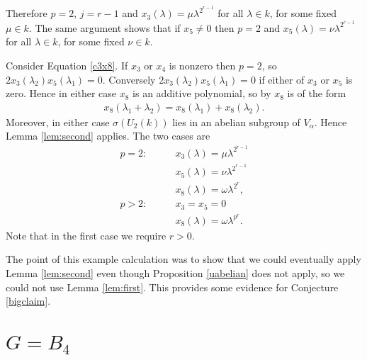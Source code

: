 Therefore $p = 2$, $j=r-1$ and $x_3(\lambda) = \mu \lambda^{2^{r-1}}$ for all $\lambda\in k$, for some fixed $\mu\in k$. The same argument shows that if $x_5 \neq 0$ then $p=2$ and $x_5(\lambda) = \nu \lambda^{2^{r-1}}$ for all $\lambda \in k$, for some fixed $\nu\in k$.

Consider Equation \ref{c3x8}. If $x_3$ or $x_4$ is nonzero then $p=2$, so $2x_3(\lambda_2)x_5(\lambda_1) = 0$. Conversely $2x_3(\lambda_2)x_5(\lambda_1) = 0$ if either of $x_3$ or $x_5$ is zero. Hence in either case $x_8$ is an additive polynomial, so by \cite[\S 20.3, Lemma A]{humphreys1975linear} $x_8$ is of the form
\begin{align*}
	x_8(\lambda_1 + \lambda_2) = x_8(\lambda_1) + x_8(\lambda_2).
\end{align*}
Moreover, in either case $\sigma\left(U_2(k)\right)$ lies in an abelian subgroup of $V_\alpha$. Hence Lemma \ref{lem:second} applies. The two cases are
\begin{align*}
p=2: \qquad&x_3(\lambda) = \mu \lambda^{2^{r-1}} \\
	&x_5(\lambda) = \nu \lambda^{2^{r-1}} \\
	&x_8(\lambda) = \omega \lambda^{2^r}, \\
p>2: \qquad&x_3=x_5=0 \\
	&x_8(\lambda) = \omega \lambda^{p^r}.
\end{align*}
Note that in the first case we require $r>0$.

The point of this example calculation was to show that we could eventually apply Lemma \ref{lem:second} even though Proposition \ref{uabelian} does not apply, so we could not use Lemma \ref{lem:first}. This provides some evidence for Conjecture \ref{bigclaim}.



\section{$G = B_4$}
\label{b4}

